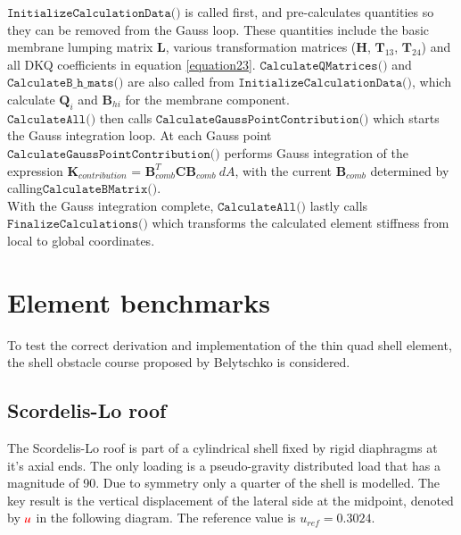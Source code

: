 $\texttt{InitializeCalculationData()}$ is called first, and pre-calculates quantities so they can be removed from the Gauss loop. These quantities include the basic membrane lumping matrix $\textbf{L}$, various transformation matrices ($\textbf{H}$, $\textbf{T}_{13}$, $\textbf{T}_{24}$) and all DKQ coefficients in equation  \eqref{equation23}. $\texttt{CalculateQMatrices()}$ and $\texttt{CalculateB$\_$h$\_$mats()}$ are also called from $\texttt{InitializeCalculationData()}$, which calculate $\textbf{Q}_i$ and $\textbf{B}_{hi}$ for the membrane component.\\

$\texttt{CalculateAll()}$ then calls $\texttt{CalculateGaussPointContribution()}$ which starts the Gauss integration loop. At each Gauss point $\texttt{CalculateGaussPointContribution()}$ performs Gauss integration of the expression $\textbf{K}_{contribution}$ = $\textbf{B}_{comb}^T \textbf{C} \textbf{B}_{comb}\  dA$, with the current $\textbf{B}_{comb}$ determined by calling\break$\texttt{CalculateBMatrix()}$. \\

With the Gauss integration complete, $\texttt{CalculateAll()}$ lastly calls $\texttt{FinalizeCalculations()}$ which transforms the calculated element stiffness from local to global coordinates.




























\section{Element benchmarks}

To test the correct derivation and implementation of the thin quad shell element, the shell obstacle course proposed by Belytschko \cite{Bel85} is considered.

\subsection{Scordelis-Lo roof}

The Scordelis-Lo roof is part of a cylindrical shell fixed by rigid diaphragms at it's axial ends. The only loading is a pseudo-gravity distributed load that has a magnitude of 90. Due to symmetry only a quarter of the shell is modelled. The key result is the vertical displacement of the lateral side at the midpoint, denoted by $\textcolor{red}{u}$ in the following diagram. The reference value is $u_{ref} = 0.3024$.

